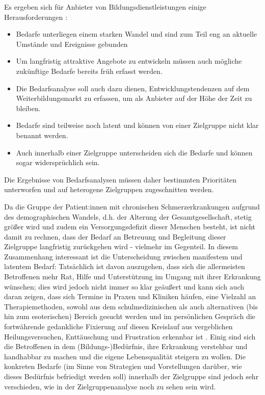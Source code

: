 \documentclass[
  twoside,
  parskip=half-,
  paper=176mm:246mm,
  BCOR=14mm,
  DIV=14,
]{scrreprt}
\begin{document}
Es ergeben sich für Anbieter von Bildungsdienstleistungen einige Herausforderungen \autocite[5]{kos}:
\begin{itemize}
  \item Bedarfe unterliegen einem starken Wandel und sind zum Teil eng an aktuelle Umstände und Ereignisse gebunden
  \item Um langfristig attraktive Angebote zu entwickeln müssen auch mögliche zukünftige Bedarfe bereits früh erfasst werden.
  \item Die Bedarfsanalyse soll auch dazu dienen, Entwicklungstendenzen auf dem Weiterbildungsmarkt zu erfassen, um als Anbieter auf der Höhe der Zeit zu bleiben.
  \item Bedarfe sind teilweise noch latent und können von einer Zielgruppe nicht klar benannt werden.
  \item Auch innerhalb einer Zielgruppe unterscheiden sich die Bedarfe und können sogar widersprüchlich sein.
\end{itemize} 

Die Ergebnisse von Bedarfsanalysen müssen daher bestimmten Prioritäten unterworfen und auf heterogene Zielgruppen zugeschnitten werden.  


\begin{praxis}
  Da die Gruppe der Patient:innen mit chronischen Schmerzerkrankungen aufgrund des demographischen Wandels, d.h. der Alterung der Gesamtgesellschaft, stetig größer wird und zudem ein Versorgungsdefizit dieser Menschen besteht, ist nicht damit zu rechnen, dass der Bedarf an Betreuung und Begleitung dieser Zielgruppe langfristig zurückgehen wird - vielmehr im Gegenteil. 
  In diesem Zusammenhang interessant ist die Unterscheidung zwischen manifestem und latentem Bedarf: Tatsächlich ist davon auszugehen, dass sich die allermeisten Betroffenen mehr Rat, Hilfe und Unterstützung im Umgang mit ihrer Erkrankung wünschen; dies wird jedoch nicht immer so klar geäußert und kann sich auch daran zeigen, dass sich Termine in Praxen und Kliniken häufen, eine Vielzahl an Therapiemethoden, sowohl aus dem schulmedizinischen als auch alternativen (bis hin zum esoterischen) Bereich gesucht werden und im persönlichen Gespräch die fortwährende gedankliche Fixierung auf diesen Kreislauf aus vergeblichen Heilungsversuchen, Enttäuschung und Frustration erkennbar ist \autocite[vgl.][10ff.]{richter}. Einig sind sich die Betroffenen in dem (Bildungs-)Bedürfnis, ihre Erkrankung verstehbar und handhabbar zu machen und die eigene Lebensqualität steigern zu wollen. Die konkreten Bedarfe (im Sinne von Strategien und Vorstellungen darüber, wie dieses Bedürfnis befriedigt werden soll) innerhalb der Zielgruppe sind jedoch sehr verschieden, wie in der Zielgruppenanalyse noch zu sehen sein wird. 
\end{praxis}
\end{document}
